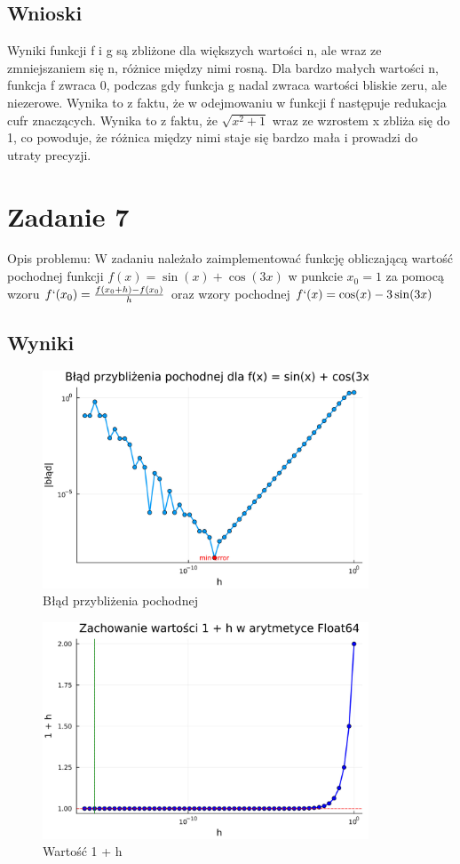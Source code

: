\documentclass{article}
\begin{document}
\subsection{Wnioski}
Wyniki funkcji f i g są zbliżone dla większych wartości n, ale wraz ze zmniejszaniem się n, różnice między nimi rosną. Dla bardzo małych wartości n, funkcja f zwraca 0, podczas gdy funkcja g nadal zwraca wartości bliskie zeru, ale niezerowe. Wynika to z faktu, że w odejmowaniu w funkcji f następuje redukacja cufr znaczących. Wynika to z faktu, że $\sqrt{x^{2}+1}$ wraz ze wzrostem x zbliża się do 1, co powoduje, że różnica między nimi staje się bardzo mała i prowadzi do utraty precyzji.
\section{Zadanie 7}
Opis problemu: \newline
W zadaniu należało zaimplementować funkcję obliczającą wartość pochodnej funkcji $f(x) = \sin(x) + \cos(3x)$ w punkcie $x_{0} = 1$ za pomocą wzoru $f`(x_{0}) = \frac{f(x_{0}+h)-f(x_{0})}{h}$ oraz wzory pochodnej $f`(x)=\cos(x)-3\sin(3x)$
\subsection{Wyniki}
\begin{figure}[ht!]
\centering
\includegraphics[width=97mm]{plot_1.jpg}
\caption{Błąd przybliżenia pochodnej}
\end{figure}
\begin{figure}[ht!]
\centering
\includegraphics[width=97mm]{plot_2.jpg}
\caption{Wartość 1 + h}
\end{figure}
\end{document}
